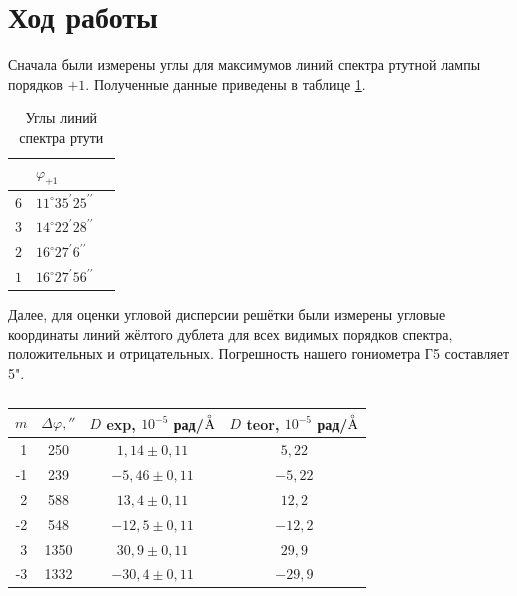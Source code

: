 \documentclass[a4paper,12pt]{article} %
\begin{document}
\section{Ход работы}

Сначала были измерены углы для максимумов линий спектра ртутной лампы порядков $+1$. Полученные данные приведены в таблице \ref{angles}.

\begin{table}[H]
    \centering
    \begin{tabular}{|p{2cm}|p{4cm}|p{4cm}|}
    \hline  \centering{№ линии} & $\varphi_{+1}$ \\ \hline
$6$   & $11^{\circ} 35^{\prime} 25^{\prime \prime}$\\ \hline
$3$   & $14^{\circ} 22^{\prime} 28^{\prime \prime}$\\ \hline
$2$   & $16^{\circ} 27^{\prime}  6^{\prime \prime}$\\ \hline
$1$   & $16^{\circ} 27^{\prime} 56^{\prime \prime}$\\ \hline


        
    
    \end{tabular}
    \caption{Углы линий спектра ртути}
    \label{angles}
\end{table}

Далее, для оценки угловой дисперсии решётки были измерены угловые координаты линий жёлтого дублета для всех видимых порядков спектра, положительных и отрицательных. Погрешность нашего гониометра Г5 составляет 5".

		\begin{table}[H]
			\caption{}
			\label{table:exp2}
			\begin{tabular}{|r|c|c|c|}
				\hline
				$m$  & $ \Delta \varphi , ''$  & $D$ exp,  $ 10^{-5} $ рад/$  \buildrel _{\circ} \over {\mathrm{A}}$   & $D$ teor,   $ 10^{-5} $ рад/$  \buildrel _{\circ} \over {\mathrm{A}}$   \\ \hline
				1  &250      & $1,14\pm 0,11$ & $5,22$  \\ \hline
				-1 & 239     &$-5,46\pm0,11$ & $-5,22$ \\ \hline
				2  & 588     &$13,4\pm0,11$ & $12,2$  \\ \hline
				-2 & 548     &$-12,5\pm 0,11$ & $-12,2$ \\ \hline
				3  & 	1350    &$30,9\pm 0,11$ & $29,9$  \\ \hline
				-3 &1332    & $-30,4\pm 0,11$ & $-29,9$ \\ \hline
			\end{tabular}
		\end{table}
\end{document}
